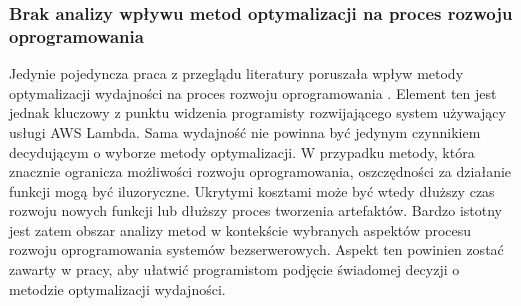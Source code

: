 \subsubsection*{Brak analizy wpływu metod optymalizacji na proces rozwoju oprogramowania}

Jedynie pojedyncza praca z przeglądu literatury poruszała wpływ metody optymalizacji wydajności na proces rozwoju oprogramowania \cite{10.1145/3377812.3382135}.
Element ten jest jednak kluczowy z punktu widzenia programisty rozwijającego system używający usługi AWS Lambda.
Sama wydajność nie powinna być jedynym czynnikiem decydującym o wyborze metody optymalizacji.
W przypadku metody, która znacznie ogranicza możliwości rozwoju oprogramowania, oszczędności za działanie funkcji mogą być iluzoryczne.
Ukrytymi kosztami może być wtedy dłuższy czas rozwoju nowych funkcji lub dłuższy proces tworzenia artefaktów.
Bardzo istotny jest zatem obszar analizy metod w kontekście wybranych aspektów procesu rozwoju oprogramowania systemów bezserwerowych.
Aspekt ten powinien zostać zawarty w pracy, aby ułatwić programistom podjęcie świadomej decyzji o metodzie optymalizacji wydajności. 
